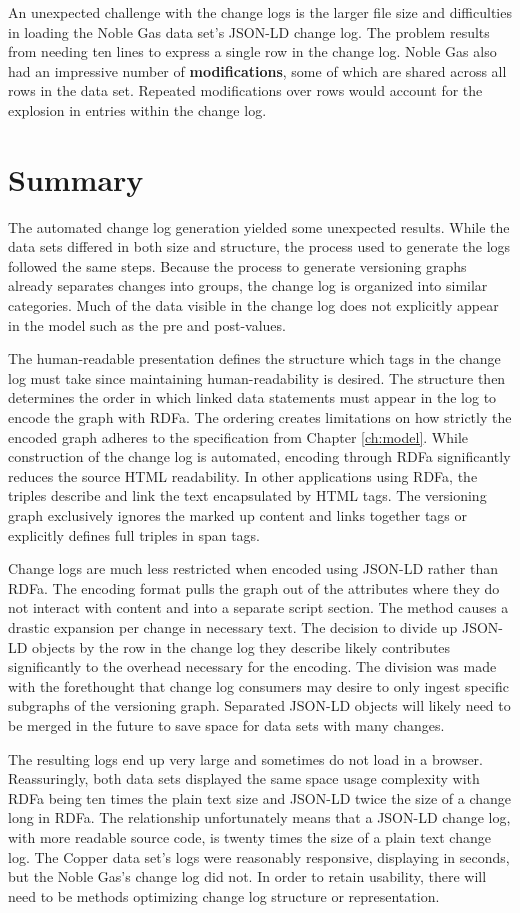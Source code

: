 An unexpected challenge with the change logs is the larger file size and difficulties in loading the Noble Gas data set's JSON-LD change log.
The problem results from needing ten lines to express a single row in the change log.
Noble Gas also had an impressive number of \textbf{modifications}, some of which are shared across all rows in the data set.
Repeated modifications over rows would account for the explosion in entries within the change log.

\section{Summary}

The automated change log generation yielded some unexpected results.
While the data sets differed in both size and structure, the process used to generate the logs followed the same steps.
Because the process to generate versioning graphs already separates changes into groups, the change log is organized into similar categories.
Much of the data visible in the change log does not explicitly appear in the model such as the pre and post-values.

The human-readable presentation defines the structure which tags in the change log must take since maintaining human-readability is desired.
The structure then determines the order in which linked data statements must appear in the log to encode the graph with RDFa.
The ordering creates limitations on how strictly the encoded graph adheres to the specification from Chapter \ref{ch:model}.
While construction of the change log is automated, encoding through RDFa significantly reduces the source HTML readability.
In other applications using RDFa, the triples describe and link the text encapsulated by HTML tags.
The versioning graph exclusively ignores the marked up content and links together tags or explicitly defines full triples in span tags.

Change logs are much less restricted when encoded using JSON-LD rather than RDFa.
The encoding format pulls the graph out of the attributes where they do not interact with content and into a separate script section.
The method causes a drastic expansion per change in necessary text.
The decision to divide up JSON-LD objects by the row in the change log they describe likely contributes significantly to the overhead necessary for the encoding.
The division was made with the forethought that change log consumers may desire to only ingest specific subgraphs of the versioning graph.
Separated JSON-LD objects will likely need to be merged in the future to save space for data sets with many changes.

The resulting logs end up very large and sometimes do not load in a browser.
Reassuringly, both data sets displayed the same space usage complexity with RDFa being ten times the plain text size and JSON-LD twice the size of a change long in RDFa.
The relationship unfortunately means that a JSON-LD change log, with more readable source code, is twenty times the size of a plain text change log.
The Copper data set's logs were reasonably responsive, displaying in seconds, but the Noble Gas's change log did not.
In order to retain usability, there will need to be methods optimizing change log structure or representation.